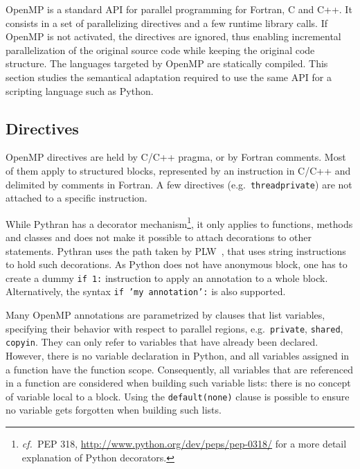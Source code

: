 \documentclass{llncs}
\newcommand\see{\emph{cf.\ }}
\begin{document}
OpenMP is a standard API for parallel programming for Fortran, C and C++. It
consists in a set of parallelizing directives and a few runtime library calls.
If OpenMP is not activated, the directives are ignored, thus enabling
incremental parallelization of the original source code while keeping the
original code structure. The languages targeted by OpenMP are statically
compiled. This section studies the semantical adaptation required to use the
same API for a scripting language such as Python.

\subsection{Directives}

OpenMP directives are held by C/C++ pragma, or by Fortran comments. Most of them
apply to structured blocks, represented by an instruction in C/C++ and delimited
by comments in Fortran. A few directives (e.g.\ \texttt{threadprivate}) are not
attached to a specific instruction.

While Pythran has a decorator mechanism\footnote{\see PEP 318,
\url{http://www.python.org/dev/peps/pep-0318/} for a more detail explanation of
Python decorators.}, it only applies to functions, methods and classes and does
not make it possible to attach decorations to other statements. Pythran uses
the path taken by PLW~\cite{dongara2007}, that uses string instructions to hold
such decorations. As Python does not have anonymous block,
one has to create a dummy \texttt{if 1:} instruction to apply an annotation to a
whole block. Alternatively, the syntax \texttt{if 'my annotation':} is also
supported. 

%

Many OpenMP annotations are parametrized by clauses that list variables,
specifying their behavior with respect to parallel regions, e.g.\
\texttt{private}, \texttt{shared}, \texttt{copyin}. They can only refer to
variables that have already been declared. However, there is no variable
declaration in Python, and all variables assigned in a function have the
function scope. Consequently, all variables that are referenced in a function
are considered when building such variable lists: there is no concept of
variable local to a block. Using the \texttt{default(none)} clause is possible
to ensure no variable gets forgotten when building such lists.
\end{document}
